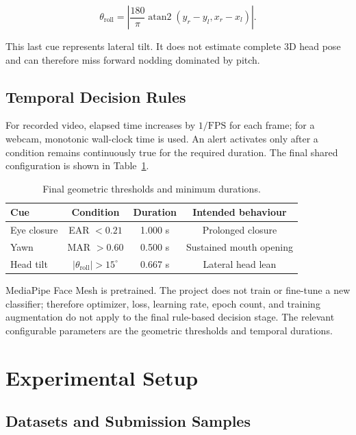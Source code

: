 \documentclass[runningheads]{llncs}
\begin{document}
\begin{equation}
\theta_{\mathrm{roll}}=
\left|\frac{180}{\pi}\operatorname{atan2}(y_r-y_l,x_r-x_l)\right|.
\label{eq:roll}
\end{equation}

This last cue represents lateral tilt. It does not estimate complete 3D head
pose and can therefore miss forward nodding dominated by pitch.

\subsection{Temporal Decision Rules}

For recorded video, elapsed time increases by $1/\mathrm{FPS}$ for each frame;
for a webcam, monotonic wall-clock time is used. An alert activates only after a
condition remains continuously true for the required duration. The final shared
configuration is shown in Table~\ref{tab:thresholds}.

\begin{table}[t]
\caption{Final geometric thresholds and minimum durations.}
\label{tab:thresholds}
\centering
\small
\begin{tabular}{@{}lccc@{}}
\toprule
Cue & Condition & Duration & Intended behaviour \\
\midrule
Eye closure & EAR $<0.21$ & 1.000 s & Prolonged closure \\
Yawn & MAR $>0.60$ & 0.500 s & Sustained mouth opening \\
Head tilt & $|\theta_{\mathrm{roll}}|>15^{\circ}$ & 0.667 s & Lateral head lean \\
\bottomrule
\end{tabular}
\end{table}

MediaPipe Face Mesh is pretrained. The project does not train or fine-tune a new
classifier; therefore optimizer, loss, learning rate, epoch count, and training
augmentation do not apply to the final rule-based decision stage. The relevant
configurable parameters are the geometric thresholds and temporal durations.

\section{Experimental Setup}

\subsection{Datasets and Submission Samples}
\end{document}
